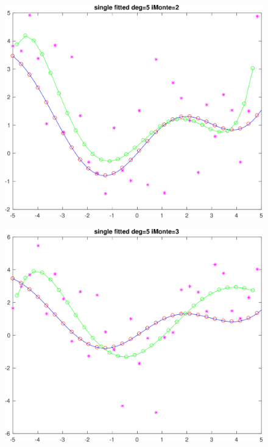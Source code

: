  \begin{figure}[h!]
\centering\includegraphics[scale=0.1]{single_poly_d_5_iMonte_2.png}
\end{figure}

\begin{figure}[h!]
\centering\includegraphics[scale=0.1]{single_poly_d_5_iMonte_3.png}
\end{figure}

